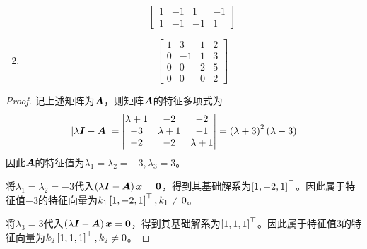 \begin{problem}
\begin{enumerate}
\begin{equation*}
\begin{bmatrix}
                  1 & -1 & 1  & -1 \\
                  1 & -1 & -1 & 1
              \end{bmatrix}
          \end{equation*}
    \item \begin{equation*}
              \begin{bmatrix}
                  1 & 3  & 1 & 2 \\
                  0 & -1 & 1 & 3 \\
                  0 & 0  & 2 & 5 \\
                  0 & 0  & 0 & 2
              \end{bmatrix}
          \end{equation*}
\end{enumerate}
\end{problem}
\begin{proof}
    记上述矩阵为\(\boldsymbol{A}\)，则矩阵\(\boldsymbol{A}\)的特征多项式为
    \begin{equation*}
        \left|\lambda\boldsymbol{I}-\boldsymbol{A} \right| =
        \begin{vmatrix}
            \lambda+1 & -2        & -2        \\
            -3        & \lambda+1 & -1        \\
            -2        & -2        & \lambda+1
        \end{vmatrix}=\left( \lambda+3 \right)^2\left( \lambda-3 \right)
    \end{equation*}
    因此\(\boldsymbol{A}\)的特征值为\(\lambda_1=\lambda_2=-3,\lambda_3=3\)。

    将\(\lambda_1=\lambda_2=-3\)代入\(\left( \lambda\boldsymbol{I}-\boldsymbol{A} \right)\boldsymbol{x}=\boldsymbol{0}\)，得到其基础解系为\(\left[ 1,-2,1 \right]^\top\)。因此属于特征值\(-3\)的特征向量为\(k_1\left[ 1,-2,1 \right]^\top,k_1\neq0\)。

    将\(\lambda_3=3\)代入\(\left( \lambda\boldsymbol{I}-\boldsymbol{A} \right)\boldsymbol{x}=\boldsymbol{0}\)，得到其基础解系为\(\left[ 1,1,1 \right]^\top\)。因此属于特征值\(3\)的特征向量为\(k_2\left[ 1,1,1 \right]^\top,k_2\neq0\)。
\end{proof}

